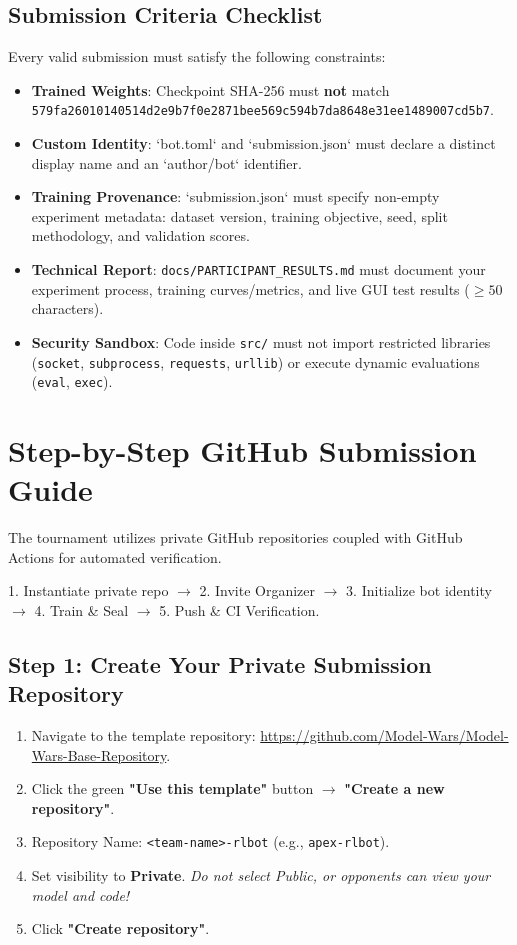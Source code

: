 \documentclass[11pt,a4paper]{article}
\begin{document}
\subsection{Submission Criteria Checklist}
Every valid submission must satisfy the following constraints:
\begin{itemize}[noitemsep]
    \item \textbf{Trained Weights}: Checkpoint SHA-256 must \textbf{not} match \texttt{579fa26010140514d2e9b7f0e2871bee569c594b7da8648e31ee1489007cd5b7}.
    \item \textbf{Custom Identity}: `bot.toml` and `submission.json` must declare a distinct display name and an `author/bot` identifier.
    \item \textbf{Training Provenance}: `submission.json` must specify non-empty experiment metadata: dataset version, training objective, seed, split methodology, and validation scores.
    \item \textbf{Technical Report}: \texttt{docs/PARTICIPANT\_RESULTS.md} must document your experiment process, training curves/metrics, and live GUI test results ($\ge 50$ characters).
    \item \textbf{Security Sandbox}: Code inside \texttt{src/} must not import restricted libraries (\texttt{socket}, \texttt{subprocess}, \texttt{requests}, \texttt{urllib}) or execute dynamic evaluations (\texttt{eval}, \texttt{exec}).
\end{itemize}

\section{Step-by-Step GitHub Submission Guide}

The tournament utilizes private GitHub repositories coupled with GitHub Actions for automated verification.

\begin{infobox}
1. Instantiate private repo $\to$ 2. Invite Organizer $\to$ 3. Initialize bot identity $\to$ 4. Train \& Seal $\to$ 5. Push \& CI Verification.
\end{infobox}

\subsection{Step 1: Create Your Private Submission Repository}
\begin{enumerate}
    \item Navigate to the template repository: \url{https://github.com/Model-Wars/Model-Wars-Base-Repository}.
    \item Click the green \textbf{"Use this template"} button $\to$ \textbf{"Create a new repository"}.
    \item Repository Name: \texttt{<team-name>-rlbot} (e.g., \texttt{apex-rlbot}).
    \item Set visibility to \textbf{Private}. \textit{Do not select Public, or opponents can view your model and code!}
    \item Click \textbf{"Create repository"}.
\end{enumerate}
\end{document}
